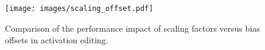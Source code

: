 \begin{figure}[thp]
    \centering
    \texttt{[image: images/scaling\_offset.pdf]}
    \caption{\label{fig:scale_off}
    Comparison of the performance impact of scaling factors versus bias offsets in activation editing.
    }
\end{figure}